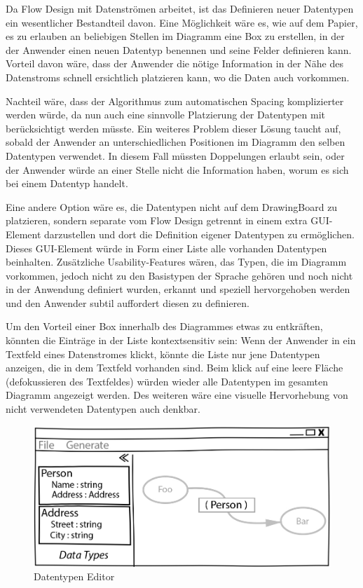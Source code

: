 Da Flow Design mit Datenströmen arbeitet, ist das Definieren neuer Datentypen
ein wesentlicher Bestandteil davon.
Eine Möglichkeit wäre es, wie auf dem Papier, es zu erlauben an beliebigen
Stellen im Diagramm eine Box zu erstellen, in der der Anwender einen neuen
Datentyp benennen und seine Felder definieren kann. Vorteil davon wäre, dass der
Anwender die nötige Information in der Nähe des Datenstroms schnell ersichtlich
platzieren kann, wo die Daten auch vorkommen.

Nachteil wäre, dass der Algorithmus zum automatischen Spacing komplizierter
werden würde, da nun auch eine sinnvolle Platzierung der Datentypen mit
berücksichtigt werden müsste.
Ein weiteres Problem dieser Lösung taucht auf, sobald der Anwender an unterschiedlichen
Positionen im Diagramm den selben Datentypen verwendet. In diesem Fall müssten Doppelungen erlaubt
sein, oder der Anwender würde an einer Stelle nicht die Information haben, worum
es sich bei einem Datentyp handelt.

Eine andere Option wäre es, die Datentypen nicht auf dem DrawingBoard zu
platzieren, sondern separate vom Flow Design getrennt in einem extra GUI-Element
darzustellen und dort die Definition eigener Datentypen zu ermöglichen.
Dieses GUI-Element würde in Form einer Liste alle vorhanden Datentypen
beinhalten. Zusätzliche Usability-Features wären, das Typen, die im Diagramm
vorkommen, jedoch nicht zu den Basistypen der Sprache gehören und noch nicht in
der Anwendung definiert wurden, erkannt und speziell hervorgehoben werden und
den Anwender subtil auffordert diesen zu definieren.

Um den Vorteil einer Box innerhalb des Diagrammes etwas zu entkräften, könnten
die Einträge in der Liste kontextsensitiv sein: Wenn der Anwender in ein
Textfeld eines Datenstromes klickt, könnte die Liste nur jene Datentypen
anzeigen, die in dem Textfeld vorhanden sind. Beim klick auf eine leere Fläche (defokussieren des Textfeldes) würden wieder alle Datentypen im gesamten Diagramm
angezeigt werden. Des weiteren wäre eine visuelle Hervorhebung von nicht
verwendeten Datentypen auch denkbar.
\bigskip

\begin{figure}[H]
	\centering
	\includegraphics[width=.9\linewidth]{./img/DatatypesCrop.jpg}
	\caption{Datentypen Editor}
\end{figure}




